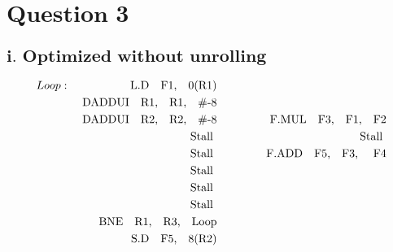 \documentclass{tufte-handout}
\begin{document}
\section{$\textbf{Question 3}$}
	\subsection{$\textbf{i. Optimized without unrolling}$}
		\begin{alignat*}{3}
			Loop : & & \mbox{ L.D\quad F1,\quad 0(R1)}            \quad\quad\quad       &&      \\
			       & & \mbox{ DADDUI\quad R1,\quad R1,\quad \#-8} \quad\quad\quad      &&      \\
			       & & \mbox{ DADDUI\quad R2,\quad R2,\quad \#-8}  \quad\quad\quad     &&  \mbox{F.MUL\quad F3,\quad F1,\quad F2}    \\
			       & & \mbox{ Stall }  \quad\quad\quad      &&  \mbox{ Stall }     \\
			       & & \mbox{ Stall }  \quad\quad\quad      &&  \mbox{ F.ADD\quad F5,\quad F3, \quad F4}     \\
			       & & \mbox{ Stall }  \quad\quad\quad      && \\ 
			       & & \mbox{ Stall }  \quad\quad\quad      && \\
			       & & \mbox{ Stall }  \quad\quad\quad      && \\
			       & & \mbox{ BNE\quad R1,\quad R3,\quad Loop}  \quad\quad\quad      &&  \\
			       & & \mbox{ S.D\quad F5,\quad 8(R2)}  \quad\quad\quad      &&   \\
		\end{alignat*}
\end{document}
